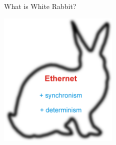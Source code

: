 \documentclass[compress,red]{beamer}
\begin{document}



\begin{frame}{What is White Rabbit?}
\begin{center}
\includegraphics[height=6.5cm]{rabbit.png}
\end{center}
\end{frame}
\end{document}
